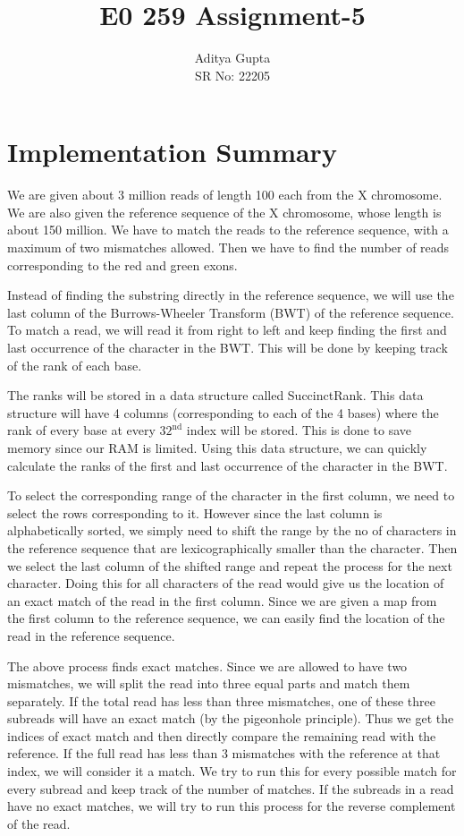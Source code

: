 \documentclass[12pt]{article}
\title{\vspace{-1.5cm}E0 259 Assignment-5}
\author{Aditya Gupta \\
SR No: 22205}
\date{}
\begin{document}
\maketitle

\section*{Implementation Summary}
We are given about 3 million reads of length 100 each from the X chromosome. We are also given the reference sequence of the X chromosome, whose length is about 150 million. We have to match the reads to the reference sequence, with a maximum of two mismatches allowed. Then we have to find the number of reads corresponding to the red and green exons.

Instead of finding the substring directly in the reference sequence, we will use the last column of the Burrows-Wheeler Transform (BWT) of the reference sequence. To match a read, we will read it from right to left and keep finding the first and last occurrence of the character in the BWT. This will be done by keeping track of the rank of each base.

The ranks will be stored in a data structure called SuccinctRank. This data structure will have 4 columns (corresponding to each of the 4 bases) where the rank of every base at every $32^{\text{nd}}$ index will be stored. This is done to save memory since our RAM is limited. Using this data structure, we can quickly calculate the ranks of the first and last occurrence of the character in the BWT.

To select the corresponding range of the character in the first column, we need to select the rows corresponding to it. However since the last column is alphabetically sorted, we simply need to shift the range by the no of characters in the reference sequence that are lexicographically smaller than the character. Then we select the last column of the shifted range and repeat the process for the next character. Doing this for all characters of the read would give us the location of an exact match of the read in the first column. Since we are given a map from the first column to the reference sequence, we can easily find the location of the read in the reference sequence.

The above process finds exact matches. Since we are allowed to have two mismatches, we will split the read into three equal parts and match them separately. If the total read has less than three mismatches, one of these three subreads will have an exact match (by the pigeonhole principle). Thus we get the indices of exact match and then directly compare the remaining read with the reference. If the full read has less than 3 mismatches with the reference at that index, we will consider it a match. We try to run this for every possible match for every subread and keep track of the number of matches. If the subreads in a read have no exact matches, we will try to run this process for the reverse complement of the read.
\end{document}
